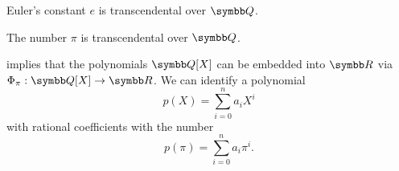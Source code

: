 \begin{theorem}\label{thm:e_is_transcendental}\label{thm:eulers_constant_is_transcendental}
  Euler's constant \( e \) is transcendental over \( \Q \).
\end{theorem}

\begin{theorem}\label{thm:pi_is_transcendental}\cite[454]{Knapp2016BAlg}
  The number \( \pi \) is transcendental over \( \Q \).
\end{theorem}

\begin{example}\label{ex:polynomials_over_pi}
   implies that the polynomials \( \Q[X] \) can be embedded into \( \R \) via \( \Phi_\pi: \Q[X] \to \R \). We can identify a polynomial
  \begin{equation*}
    p(X) = \sum_{i=0}^n a_i X^i
  \end{equation*}
  with rational coefficients with the number
  \begin{equation*}
    p(\pi) = \sum_{i=0}^n a_i \pi^i.
  \end{equation*}
\end{example}

